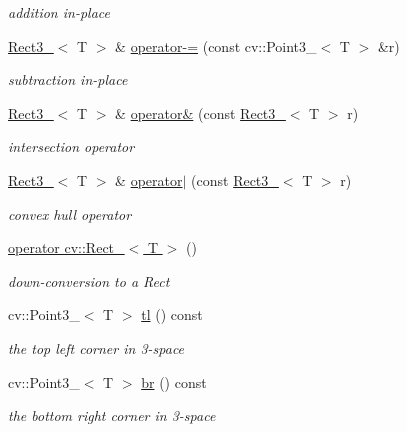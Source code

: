 \begin{DoxyCompactItemize}
\begin{DoxyCompactList}\small\item\em addition in-\/place \end{DoxyCompactList}\item 
\hyperlink{classRect3__}{\-Rect3\-\_\-}$<$ \-T $>$ \& \hyperlink{classRect3___a3a626255017a7cef76e065c51ef1504f}{operator-\/=} (const cv\-::\-Point3\-\_\-$<$ \-T $>$ \&r)
\begin{DoxyCompactList}\small\item\em subtraction in-\/place \end{DoxyCompactList}\item 
\hyperlink{classRect3__}{\-Rect3\-\_\-}$<$ \-T $>$ \& \hyperlink{classRect3___a24609371fde6d5c8383dbb210bb75b5e}{operator\&} (const \hyperlink{classRect3__}{\-Rect3\-\_\-}$<$ \-T $>$ r)
\begin{DoxyCompactList}\small\item\em intersection operator \end{DoxyCompactList}\item 
\hyperlink{classRect3__}{\-Rect3\-\_\-}$<$ \-T $>$ \& \hyperlink{classRect3___a0f988dcf6a9ad19243844abf4acba653}{operator$|$} (const \hyperlink{classRect3__}{\-Rect3\-\_\-}$<$ \-T $>$ r)
\begin{DoxyCompactList}\small\item\em convex hull operator \end{DoxyCompactList}\item 
\hyperlink{classRect3___a4f49b82908b88ed545690bfff932ea30}{operator cv\-::\-Rect\-\_\-$<$ T $>$} ()
\begin{DoxyCompactList}\small\item\em down-\/conversion to a \-Rect \end{DoxyCompactList}\item 
cv\-::\-Point3\-\_\-$<$ \-T $>$ \hyperlink{classRect3___a8df208aa3d316ea706a529db292d1a0f}{tl} () const 
\begin{DoxyCompactList}\small\item\em the top left corner in 3-\/space \end{DoxyCompactList}\item 
cv\-::\-Point3\-\_\-$<$ \-T $>$ \hyperlink{classRect3___a253d895d86ec7718351f29ff3cd0cd27}{br} () const 
\begin{DoxyCompactList}\small\item\em the bottom right corner in 3-\/space \end{DoxyCompactList}\item 

\end{DoxyCompactItemize}
